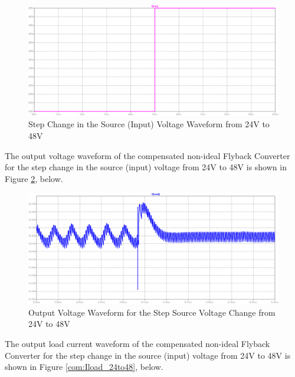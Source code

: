 \begin{figure}[H]
\begin{center}
\includegraphics[width=1\textwidth]{comp_simulations/Vin_24to48.png}
\caption{Step Change in the Source (Input) Voltage Waveform from 24V to 48V}
\label{com:Vin_24to48}
\end{center}
\end{figure}

The output voltage waveform of the compensated non-ideal Flyback Converter for the step change in the source (input) voltage from 24V to 48V is shown in Figure \ref{com:Vout_24to48}, below.

\begin{figure}[H]
\begin{center}
\includegraphics[width=1\textwidth]{comp_simulations/Vout_24to48.png}
\caption{Output Voltage Waveform for the Step Source Voltage Change from 24V to 48V}
\label{com:Vout_24to48}
\end{center}
\end{figure}

The output load current waveform of the compensated non-ideal Flyback Converter for the step change in the source (input) voltage from 24V to 48V is shown in Figure \ref{com:Iload_24to48}, below.


